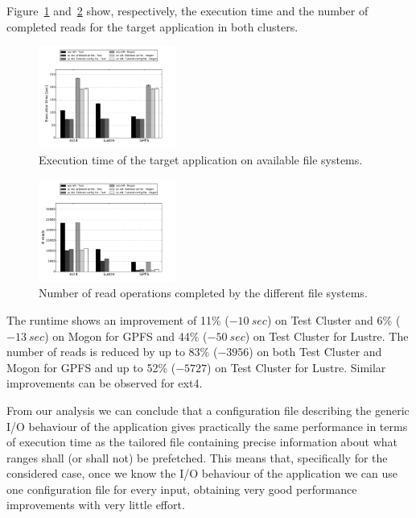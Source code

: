\documentclass[conference]{IEEEtran}
\begin{document}
Figure~\ref{figure: exec_time_comparison} and~\ref{figure: reads_final_comparison} show, respectively, the execution time and the number of completed reads for the target application in both clusters. 
\begin{figure}[!htb]
  \centering
  \includegraphics[width=0.4\textwidth]{figures/plot_runtime_inputfile_00050}
  \caption{Execution time of the target application on available file systems.}
  \label{figure: exec_time_comparison}
\end{figure}
\begin{figure}[!htb]
  \centering
  \includegraphics[width=0.4\textwidth]{figures/plot_reads_inputfile_00050}
  \caption{Number of read operations completed by the different file systems.}
  \label{figure: reads_final_comparison}
\end{figure}
The runtime shows an improvement of 11\% ($-10\ sec$) on Test Cluster and 6\% ($-13\ sec$) on Mogon for GPFS and 44\% ($-50\ sec$) on Test Cluster for Lustre. The number of reads is reduced by up to 83\% ($-3956$) on both Test Cluster and Mogon for GPFS and up to 52\% ($-5727$) on Test Cluster for Lustre. Similar improvements can be observed for ext4. 

From our analysis we can conclude that a configuration file describing the generic I/O behaviour of the application gives practically the same performance in terms of execution time as the tailored file containing precise information about what ranges shall (or shall not) be prefetched. This means that, specifically for the considered case, once we know the I/O behaviour of the application we can use one configuration file for every input, obtaining very good performance improvements with very little effort.
\end{document}
